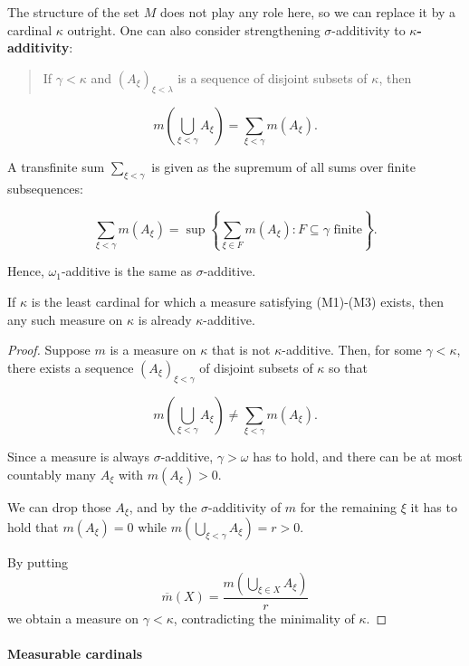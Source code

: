 The structure of the set $M$ does not play any role here, so we can replace it by a cardinal $\kappa$ outright. One can also consider strengthening $\sigma$-additivity to \textbf{$\kappa$-additivity}:

\begin{quote}
If $\gamma < \kappa$ and  $(A_\xi)_{\xi< \lambda}$ is a sequence of disjoint subsets of $\kappa$, then
\end{quote}
\begin{equation*}
m(\bigcup_{\xi<\gamma} A_\xi) =  \sum_{\xi<\gamma} m(A_\xi).
\end{equation*}

A transfinite sum $\sum_{\xi<\gamma}$ is given as the supremum of all sums over finite subsequences:

\begin{equation}
\sum_{\xi<\gamma} m(A_\xi) = \sup \left \{ \sum_{\xi \in F} m(A_\xi) \colon F \subseteq \gamma \text{ finite}\right \}.
\end{equation}

Hence, $\omega_1$-additive is the same as $\sigma$-additive.

\begin{theorem}[Banach]\label{thm-kappa-additivity}If $\kappa$ is the least cardinal for which a measure satisfying (M1)-(M3) exists, then any such measure on $\kappa$ is already $\kappa$-additive.

\end{theorem}\begin{proof}Suppose $m$ is a measure on $\kappa$ that is not $\kappa$-additive.
Then, for some $\gamma < \kappa$, there exists a sequence $(A_\xi)_{ \xi< \gamma}$ of disjoint subsets of $\kappa$ so that

\begin{equation}
m(\bigcup_{\xi<\gamma} A_\xi) \ne  \sum_{\xi<\gamma} m(A_\xi).
\end{equation}

Since a measure is always $\sigma$-additive, $\gamma > \omega$ has to hold, and there can be at most countably many $A_\xi$ with $m(A_\xi)>0$.

We can drop those $A_\xi$, and by the $\sigma$-additivity of $m$ for the remaining $\xi$ it has to hold that $m(A_\xi)=0$ while $m \left(\bigcup_{\xi<\gamma} A_\xi \right) = r >0$.

By putting
\begin{equation*}
\overline{m}(X) = \frac{m(\bigcup_{\xi \in X} A_\xi)}{r}
\end{equation*}
we obtain a measure on $\gamma < \kappa$, contradicting the minimality of $\kappa$.

\end{proof}\paragraph{Measurable cardinals}

